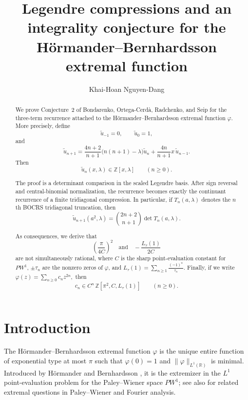 \documentclass[11pt,letterpaper]{amsart}
\title[Legendre compressions and integrality]{Legendre compressions and an integrality conjecture for the H\"ormander--Bernhardsson extremal function}
\author{Khai-Hoan Nguyen-Dang}
\date{}
\numberwithin{equation}{section}
\theoremstyle{plain}
\theoremstyle{remark}
\newcommand{\Z}{\mathbb{Z}}
\newcommand{\R}{\mathbb{R}}
\begin{document}
\begin{abstract}
We prove Conjecture~2 of Bondarenko, Ortega-Cerd\`a, Radchenko, and Seip for the
three-term recurrence attached to the H\"ormander--Bernhardsson extremal function
\(\varphi\). More precisely, define
\[
\widetilde u_{-1}=0,\qquad \widetilde u_0=1,
\]
and
\[
\widetilde u_{n+1}
=
\frac{4n+2}{n+1}\bigl(n(n+1)-\lambda\bigr)\widetilde u_n
+
\frac{4n}{n+1}x\,\widetilde u_{n-1}.
\]
Then
\[
\widetilde u_n(x,\lambda)\in\Z[x,\lambda]
\qquad(n\ge0).
\]

The proof is a determinant comparison in the scaled Legendre basis. After sign reversal and
central-binomial normalization, the recurrence becomes exactly the continuant recurrence of a
finite tridiagonal compression. In particular, if \(T_n(a,\lambda)\) denotes the \(n\)th BOCRS
tridiagonal truncation, then
\[
\widetilde u_{n+1}(a^2,\lambda)=\binom{2n+2}{n+1}\det T_n(a,\lambda).
\]

As consequences, we derive that
\[
\left(\frac{\pi}{4C}\right)^2
\quad\text{and}\quad
-\frac{L_\tau(1)}{2C}
\]
are not simultaneously rational, where \(C\) is the sharp point-evaluation constant for
\(PW^1\), \(\pm\tau_n\) are the nonzero zeros of \(\varphi\), and \( L_\tau(1)=\sum_{n\ge1}\frac{(-1)^n}{\tau_n}.\)
Finally, if we write \(\varphi(z)=\sum_{n\ge0}c_n z^{2n},\) then
\[
c_n\in C^n\,\Z[\pi^2,C,L_\tau(1)]
\qquad(n\ge0).
\]
\end{abstract}

\maketitle

\section{Introduction}
\label{sec:introduction}

The H\"ormander--Bernhardsson extremal function \(\varphi\) is the unique entire function of
exponential type at most \(\pi\) such that \(\varphi(0)=1\) and
\(\|\varphi\|_{L^1(\R)}\) is minimal. Introduced by H\"ormander and Bernhardsson
\cite{HB93}, it is the extremizer in the \(L^1\) point-evaluation problem for the
Paley--Wiener space \(PW^1\); see also
\cite{BhatiaDavisKoosis89,BrevigChirreOrtegaSeip24} for related extremal questions in
Paley--Wiener and Fourier analysis.
\end{document}
